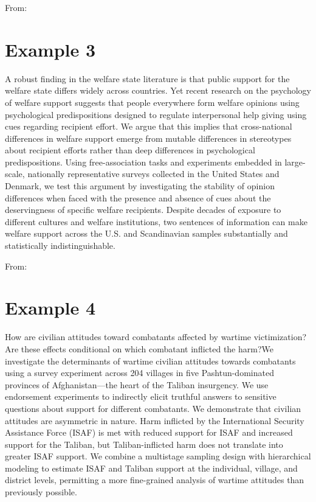\documentclass[a4, 12pt]{article}
\begin{document}
\vspace{1em}\noindent From: 

\section*{Example 3}

A robust finding in the welfare state literature is that public support for the welfare state differs widely across countries. Yet recent research on the psychology of welfare support suggests that people everywhere form welfare opinions using psychological predispositions designed to regulate interpersonal help giving using cues regarding recipient effort. We argue that this implies that cross-national differences in welfare support emerge from mutable differences in stereotypes about recipient efforts rather than deep differences in psychological predispositions. Using free-association tasks and experiments embedded in large-scale, nationally representative surveys collected in the United States and Denmark, we test this argument by investigating the stability of opinion differences when faced with the presence and absence of cues about the deservingness of specific welfare recipients. Despite decades of exposure to different cultures and welfare institutions, two sentences of information can make welfare support across the U.S. and Scandinavian samples substantially and statistically indistinguishable.

\vspace{1em}\noindent From: 

\section*{Example 4}

How are civilian attitudes toward combatants affected by wartime victimization? Are these effects conditional on which combatant inflicted the harm?We investigate the determinants of wartime civilian attitudes towards combatants using a survey experiment across 204 villages in five Pashtun-dominated provinces of Afghanistan---the heart of the Taliban insurgency. We use endorsement experiments to indirectly elicit truthful answers to sensitive questions about support for different combatants. We demonstrate that civilian attitudes are asymmetric in nature. Harm inflicted by the International Security Assistance Force (ISAF) is met with reduced support for ISAF and increased support for the Taliban, but Taliban-inflicted harm does not translate into greater ISAF support. We combine a multistage sampling design with hierarchical modeling to estimate ISAF and Taliban support at the individual, village, and district levels, permitting a more fine-grained analysis of wartime attitudes than previously possible.
\end{document}
